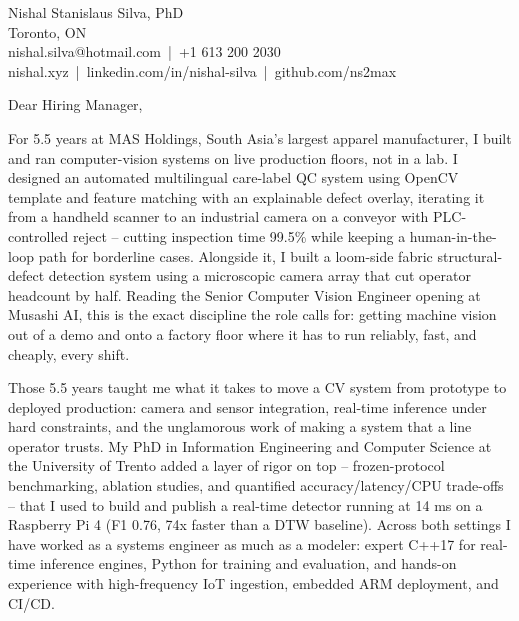 \documentclass[11pt]{article}
\begin{document}
\pagestyle{empty}

\noindent Nishal Stanislaus Silva, PhD \\
Toronto, ON \\
nishal.silva@hotmail.com \,|\, +1 613 200 2030 \\
nishal.xyz \,|\, linkedin.com/in/nishal-silva \,|\, github.com/ns2max

\vspace{1.5em}

\noindent Dear Hiring Manager,

\vspace{1em}

\noindent For 5.5 years at MAS Holdings, South Asia's largest apparel manufacturer, I built and ran computer-vision systems on live production floors, not in a lab. I designed an automated multilingual care-label QC system using OpenCV template and feature matching with an explainable defect overlay, iterating it from a handheld scanner to an industrial camera on a conveyor with PLC-controlled reject -- cutting inspection time 99.5\% while keeping a human-in-the-loop path for borderline cases. Alongside it, I built a loom-side fabric structural-defect detection system using a microscopic camera array that cut operator headcount by half. Reading the Senior Computer Vision Engineer opening at Musashi AI, this is the exact discipline the role calls for: getting machine vision out of a demo and onto a factory floor where it has to run reliably, fast, and cheaply, every shift.

\vspace{1em}

\noindent Those 5.5 years taught me what it takes to move a CV system from prototype to deployed production: camera and sensor integration, real-time inference under hard constraints, and the unglamorous work of making a system that a line operator trusts. My PhD in Information Engineering and Computer Science at the University of Trento added a layer of rigor on top -- frozen-protocol benchmarking, ablation studies, and quantified accuracy/latency/CPU trade-offs -- that I used to build and publish a real-time detector running at 14 ms on a Raspberry Pi 4 (F1 0.76, 74x faster than a DTW baseline). Across both settings I have worked as a systems engineer as much as a modeler: expert C++17 for real-time inference engines, Python for training and evaluation, and hands-on experience with high-frequency IoT ingestion, embedded ARM deployment, and CI/CD.

\vspace{1em}
\end{document}
